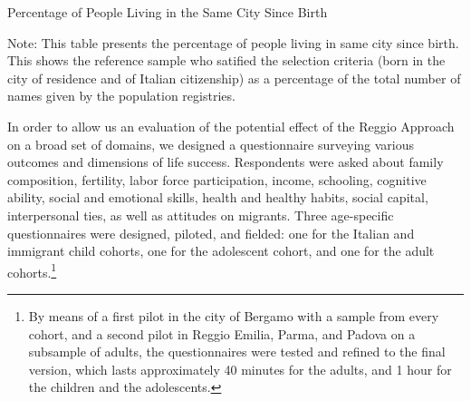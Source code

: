 \begin{table}[H]
\centering
\begin{threeparttable}
	\caption{Percentage of People Living in the Same City Since Birth}\label{tab:immigration}
	
\begin{tablenotes}
\footnotesize
Note: This table presents the percentage of people living in same city since birth. This  shows the reference sample who satified the selection criteria (born in the city of residence and of Italian citizenship) as a percentage of the total number of names given by the population registries.
\end{tablenotes}
\end{threeparttable}
\end{table}


In order to allow us an evaluation of the potential effect of the Reggio Approach on a broad set of domains, we designed a questionnaire surveying various outcomes and dimensions of life success. Respondents were asked about family composition, fertility, labor force participation, income, schooling, cognitive ability, social and emotional skills, health and healthy habits, social capital, interpersonal ties, as well as attitudes on migrants. Three age-specific questionnaires were designed, piloted, and fielded: one for the Italian and immigrant child cohorts, one for the adolescent cohort, and one for the adult cohorts.\footnote{By means of a first pilot in the city of Bergamo with a sample from every cohort, and a second pilot in Reggio Emilia, Parma, and Padova on a subsample of adults, the questionnaires were tested and refined to the final version, which lasts approximately 40 minutes for the adults, and 1 hour for the children and the adolescents.}


